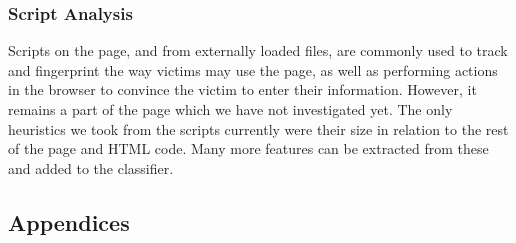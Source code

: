 \documentclass[12pt,twoside]{report}
\begin{document}
\subsection{Script Analysis}
Scripts on the page, and from externally loaded files, are commonly used to track and fingerprint the way victims may use the page, as well as performing actions in the browser to convince the victim to enter their information. However, it remains a part of the page which we have not investigated yet. The only heuristics we took from the scripts currently were their size in relation to the rest of the page and HTML code. Many more features can be extracted from these and added to the classifier.
\begin{spacing}{1}
\clearpage
\pagestyle{plain}
\printbibliography
% 
% 
\clearpage
\pagestyle{mystyle}
\appendix
\chapter{Appendices}

\end{spacing}
\end{document}
